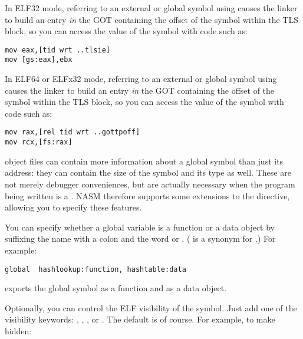 
In ELF32 mode, referring to an external or global symbol using
 causes the linker to build
an entry \emph{in} the GOT containing the
offset of the symbol within the TLS block, so you can access the value
of the symbol with code such as:

\begin{lstlisting}
mov eax,[tid wrt ..tlsie]
mov [gs:eax],ebx
\end{lstlisting}

In ELF64 or ELFx32 mode, referring to an external or global symbol using
 causes the linker to build an
entry \emph{in} the GOT containing the offset of the symbol within the TLS
block, so you can access the value of the symbol with code such as:

\begin{lstlisting}
mov rax,[rel tid wrt ..gottpoff]
mov rcx,[fs:rax]
\end{lstlisting}


 object files can contain more information about a global symbol
than just its address: they can contain the 
size of the symbol and its 
type as well. These are not merely debugger conveniences,
but are actually necessary when the program being written is a
. NASM therefore supports some extensions to the
 directive, allowing you to specify these features.

You can specify whether a global variable is a function or a data
object by suffixing the name with a colon and the word
 or . ( is
a synonym for .) For example:

\begin{lstlisting}
global  hashlookup:function, hashtable:data
\end{lstlisting}

exports the global symbol  as a function and
 as a data object.

Optionally, you can control the ELF visibility of the symbol. Just
add one of the visibility keywords: ,
, , or .
The default is  of course. For example, to make
 hidden:

